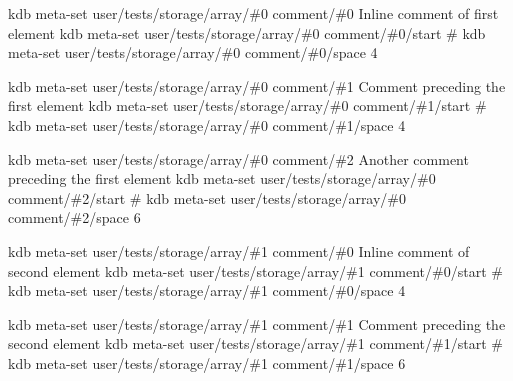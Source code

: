 kdb meta-\/set \textquotesingle{}user/tests/storage/array/\#0\textquotesingle{} \textquotesingle{}comment/\#0\textquotesingle{} \textquotesingle{} Inline comment of first element\textquotesingle{} kdb meta-\/set \textquotesingle{}user/tests/storage/array/\#0\textquotesingle{} \textquotesingle{}comment/\#0/start\textquotesingle{} \textquotesingle{}\#\textquotesingle{} kdb meta-\/set \textquotesingle{}user/tests/storage/array/\#0\textquotesingle{} \textquotesingle{}comment/\#0/space\textquotesingle{} \textquotesingle{}4\textquotesingle{}

kdb meta-\/set \textquotesingle{}user/tests/storage/array/\#0\textquotesingle{} \textquotesingle{}comment/\#1\textquotesingle{} \textquotesingle{} Comment preceding the first element\textquotesingle{} kdb meta-\/set \textquotesingle{}user/tests/storage/array/\#0\textquotesingle{} \textquotesingle{}comment/\#1/start\textquotesingle{} \textquotesingle{}\#\textquotesingle{} kdb meta-\/set \textquotesingle{}user/tests/storage/array/\#0\textquotesingle{} \textquotesingle{}comment/\#1/space\textquotesingle{} \textquotesingle{}4\textquotesingle{}

kdb meta-\/set \textquotesingle{}user/tests/storage/array/\#0\textquotesingle{} \textquotesingle{}comment/\#2\textquotesingle{} \textquotesingle{} Another comment preceding the first element\textquotesingle{} kdb meta-\/set \textquotesingle{}user/tests/storage/array/\#0\textquotesingle{} \textquotesingle{}comment/\#2/start\textquotesingle{} \textquotesingle{}\#\textquotesingle{} kdb meta-\/set \textquotesingle{}user/tests/storage/array/\#0\textquotesingle{} \textquotesingle{}comment/\#2/space\textquotesingle{} \textquotesingle{}6\textquotesingle{}

kdb meta-\/set \textquotesingle{}user/tests/storage/array/\#1\textquotesingle{} \textquotesingle{}comment/\#0\textquotesingle{} \textquotesingle{} Inline comment of second element\textquotesingle{} kdb meta-\/set \textquotesingle{}user/tests/storage/array/\#1\textquotesingle{} \textquotesingle{}comment/\#0/start\textquotesingle{} \textquotesingle{}\#\textquotesingle{} kdb meta-\/set \textquotesingle{}user/tests/storage/array/\#1\textquotesingle{} \textquotesingle{}comment/\#0/space\textquotesingle{} \textquotesingle{}4\textquotesingle{}

kdb meta-\/set \textquotesingle{}user/tests/storage/array/\#1\textquotesingle{} \textquotesingle{}comment/\#1\textquotesingle{} \textquotesingle{} Comment preceding the second element\textquotesingle{} kdb meta-\/set \textquotesingle{}user/tests/storage/array/\#1\textquotesingle{} \textquotesingle{}comment/\#1/start\textquotesingle{} \textquotesingle{}\#\textquotesingle{} kdb meta-\/set \textquotesingle{}user/tests/storage/array/\#1\textquotesingle{} \textquotesingle{}comment/\#1/space\textquotesingle{} \textquotesingle{}6\textquotesingle{}

